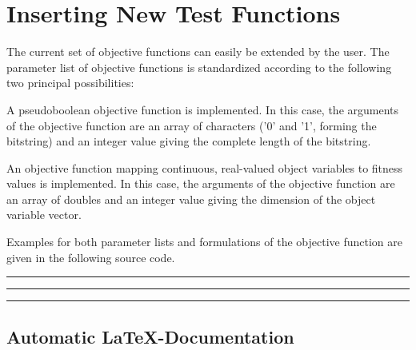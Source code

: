 %
%

\section{Inserting New Test Functions}\label{genesis-mod}
 
The current set of objective functions can easily be extended by the user.
The parameter list of objective functions is standardized according to 
the following two principal possibilities:
%
\begin{Enumerate}
%
\item	A pseudoboolean objective function is implemented.
	In this case, the arguments of the objective function are an 
	array of characters ('0' and '1', forming the bitstring) and
	an integer value giving the complete length of the bitstring.
%
\item	An objective function mapping continuous, real-valued object 
	variables to fitness values is implemented.
	In this case, the arguments of the objective function are
	an array of doubles and an integer value giving the dimension
	of the object variable vector.
%
\end{Enumerate}
%
Examples for both parameter lists and formulations of the objective 
function are given in the following source code.

\baselineskip
\noindent\rule{\textwidth}{0.1pt}

\begin{scriptsize}

\end{scriptsize}

\noindent\rule{\textwidth}{0.1pt}

\begin{scriptsize}

\end{scriptsize}
\noindent\rule{\textwidth}{0.1pt}
\baselineskip

\subsection{Automatic \LaTeX-Documentation}

